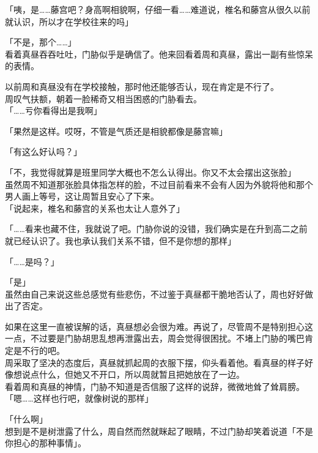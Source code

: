 「咦，是……藤宫吧？身高啊相貌啊，仔细一看……难道说，椎名和藤宫从很久以前就认识，所以才在学校往来的吗」

「不是，那个……」\\

看着真昼吞吞吐吐，门胁似乎是确信了。他来回看着周和真昼，露出一副有些惊呆的表情。

以前周和真昼没有在学校接触，那时他还能够否认，现在肯定是不行了。\\

周叹气扶额，朝着一脸稀奇又相当困惑的门胁看去。\\

「……亏你看得出是我啊」

「果然是这样。哎呀，不管是气质还是相貌都像是藤宫嘛」

「有这么好认吗？」

「不，我觉得就算是班里同学大概也不怎么认得出。你又不太会摆出这张脸」\\

虽然周不知道那张脸具体指怎样的脸，不过目前看来不会有人因为外貌将他和那个男人画上等号，这让周暂且安心了下来。\\

「说起来，椎名和藤宫的关系也太让人意外了」

「……看来也藏不住，我就说了吧。门胁你说的没错，我们确实是在升到高二之前就已经认识了。我也承认我们关系不错，但不是你想的那样」

「……是吗？」

「是」\\

虽然由自己来说这些总感觉有些悲伤，不过鉴于真昼都干脆地否认了，周也好好做出了否定。

如果在这里一直被误解的话，真昼想必会很为难。再说了，尽管周不是特别担心这一点，不过要是门胁胡思乱想再泄露出去，周会觉得很困扰。不堵上门胁的嘴巴肯定是不行的吧。\\

周采取了坚决的态度后，真昼就抓起周的衣服下摆，仰头看着他。看真昼的样子好像想说点什么，但她又不开口，所以周就暂且把她放在了一边。\\

看着周和真昼的神情，门胁不知道是否信服了这样的说辞，微微地耸了耸肩膀。\\

「嗯……这样也行吧，就像树说的那样」

「什么啊」\\

想到是不是树泄露了什么，周自然而然就眯起了眼睛，不过门胁却笑着说道「不是你担心的那种事情」。\\

